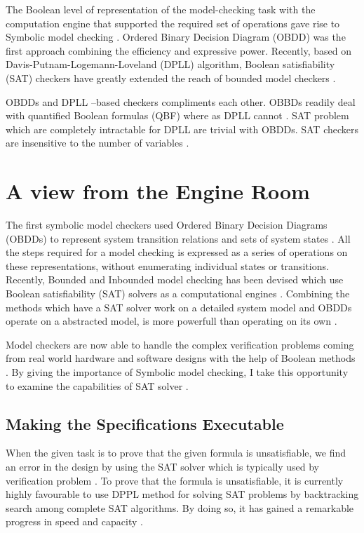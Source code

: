 \documentclass[a4paper,10pt]{report}
\begin{document}
The Boolean level of representation of the model-checking task with the computation engine that supported the required set of operations gave rise to Symbolic model checking \cite{Bryant1986}. Ordered Binary Decision Diagram (OBDD) was the first approach combining the efficiency and expressive power. Recently, based on Davis-Putnam-Logemann-Loveland (DPLL) algorithm, Boolean satisfiability (SAT) checkers have greatly extended the reach of bounded model checkers \cite{Bryant1986}.

OBDDs and DPLL –based checkers compliments each other. OBBDs readily deal with quantified Boolean formulas (QBF) where as DPLL cannot \cite{Bryant1986}. SAT problem which are completely intractable for DPLL are trivial with OBDDs. SAT checkers are insensitive to the number of variables \cite{Strichman}.

\section{A view from the Engine Room}
\label{View from engine}

The first symbolic model checkers used Ordered Binary Decision Diagrams (OBDDs) \cite{Bryant1986} to represent system transition relations and sets of system states \cite{McMillan1992} . All the steps required for a model checking is expressed as a series of operations on these representations, without enumerating individual states or transitions. Recently, Bounded and Inbounded model checking has been devised which use Boolean satisfiability (SAT) solvers as a computational engines \cite{McMillan1992}. Combining the methods which have a SAT solver work on a detailed system model and OBDDs operate on a abstracted model, is more powerfull than operating on its own \cite{Clarke1999}.

Model checkers are now able to handle the complex verification problems coming from real world hardware and software designs with the help of Boolean methods \cite{ErichGamma1995}. By giving the importance of Symbolic model checking, I take this opportunity to examine the capabilities of SAT solver \cite{Bryant1986}.

\subsection{Making the Specifications Executable}
\label{Spec Exec}

When the given task is to prove that the given formula is unsatisfiable, we find an error in the design by using the SAT solver which is typically used by verification problem \cite{McMillan2003}. To prove that the formula is unsatisfiable, it is currently highly favourable to use DPPL method \cite{M.Davis1962} for solving SAT problems by backtracking search among complete SAT algorithms. By doing so, it has gained a remarkable progress in speed and capacity \cite{M.Moskewicz2001}.
\end{document}
